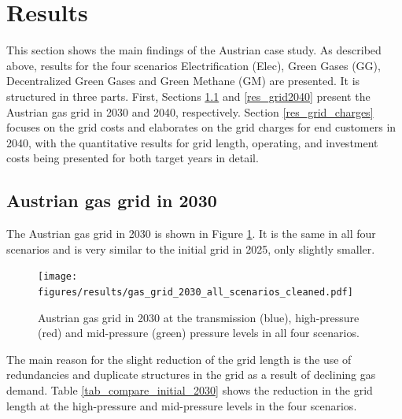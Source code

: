 \section{Results}\label{results}
This section shows the main findings of the Austrian case study. As described above, results for the four scenarios Electrification (Elec), Green Gases (GG), Decentralized Green Gases and Green Methane (GM) are presented. It is structured in three parts. First, Sections \ref{res_grid2030} and \ref{res_grid2040} present the Austrian gas grid in 2030 and 2040, respectively. Section \ref{res_grid_charges} focuses on the grid costs and elaborates on the grid charges for end customers in 2040, with the quantitative results for grid length, operating, and investment costs being presented for both target years in detail. 

\subsection{Austrian gas grid in 2030}\label{res_grid2030}
The Austrian gas grid in 2030 is shown in Figure \ref{fig_grid_2030}. It is the same in all four scenarios and is very similar to the initial grid in 2025, only slightly smaller. 

\begin{figure}[h]
	\centering
	\texttt{[image: figures/results/gas\_grid\_2030\_all\_scenarios\_cleaned.pdf]}
	\caption{Austrian gas grid in 2030 at the transmission (blue), high-pressure (red) and mid-pressure (green) pressure levels in all four scenarios.}
	\label{fig_grid_2030}
\end{figure}

The main reason for the slight reduction of the grid length is the use of redundancies and duplicate structures in the grid as a result of declining gas demand. Table \ref{tab_compare_initial_2030} shows the reduction in the grid length at the high-pressure and mid-pressure levels in the four scenarios. 

